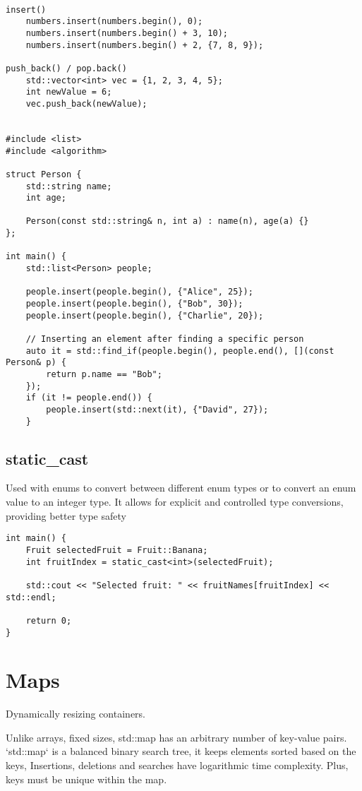 \documentclass[openany]{report}
\begin{document}
\begin{verbatim}

insert()
    numbers.insert(numbers.begin(), 0); 
    numbers.insert(numbers.begin() + 3, 10);
    numbers.insert(numbers.begin() + 2, {7, 8, 9});

push_back() / pop.back()
    std::vector<int> vec = {1, 2, 3, 4, 5};
    int newValue = 6;
    vec.push_back(newValue);


#include <list>
#include <algorithm>

struct Person {
    std::string name;
    int age;

    Person(const std::string& n, int a) : name(n), age(a) {}
};

int main() {
    std::list<Person> people;

    people.insert(people.begin(), {"Alice", 25});
    people.insert(people.begin(), {"Bob", 30});
    people.insert(people.begin(), {"Charlie", 20});

    // Inserting an element after finding a specific person
    auto it = std::find_if(people.begin(), people.end(), [](const Person& p) {
        return p.name == "Bob";
    });
    if (it != people.end()) {
        people.insert(std::next(it), {"David", 27});
    }
\end{verbatim}

\subsection{static\_cast}

Used with enums to convert between different enum types or to convert an enum value to an integer type.
It allows for explicit and controlled type conversions, providing better type safety

\begin{verbatim}
int main() {
    Fruit selectedFruit = Fruit::Banana;
    int fruitIndex = static_cast<int>(selectedFruit);

    std::cout << "Selected fruit: " << fruitNames[fruitIndex] << std::endl;

    return 0;
}
\end{verbatim}


\section{Maps}

Dynamically resizing containers.

Unlike arrays, fixed sizes, std::map has an arbitrary number of key-value pairs.
`std::map` is a balanced binary search tree, it keeps elements sorted based on the keys, 
Insertions, deletions and searches have logarithmic time complexity.
Plus, keys must be unique within the map.
\end{document}
